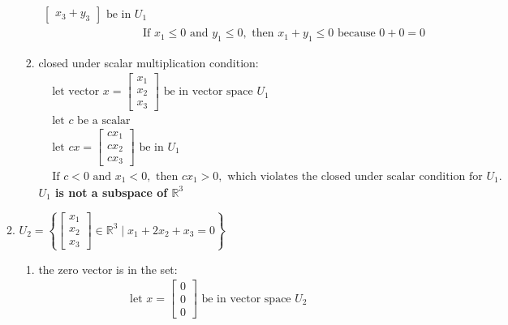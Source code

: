 \documentclass[11pt]{article}
\begin{document}
\begin{enumerate}
\begin{enumerate}
\begin{enumerate}
\[\begin{aligned}
\begin{bmatrix}
                x_3 + y_3
            \end{bmatrix} \text{ be in } U_1 \\
            &\text{If } x_1 \leq 0 \text{ and } y_1 \leq 0, \text{ then } x_1 + y_1 \leq 0 \text{ because } 0 + 0 = 0
        \end{aligned}
        \]
        \item closed under scalar multiplication condition:
        \[
        \begin{aligned}
            &\text{let vector } x = \begin{bmatrix}
                x_1 \\
                x_2 \\
                x_3
            \end{bmatrix} \text{ be in vector space } U_1 \\
            &\text{let } c \text{ be a scalar} \\
            &\text{let } cx = \begin{bmatrix}
                cx_1 \\
                cx_2 \\
                cx_3
            \end{bmatrix} \text{ be in } U_1 \\
           & \text{If } c < 0 \text{ and } x_1 < 0, \text{ then } c x_1 > 0, \text{ which violates the closed under scalar condition for } U_1.
        \end{aligned}
        \]
        \textbf{ \( U_1 \) is not a subspace of \( \mathbb{R}^3 \)}
    \end{enumerate}
    \item \( U_2 = \left\{ \begin{bmatrix}
        x_1 \\
        x_2 \\
        x_3
        \end{bmatrix} \in \mathbb{R}^3 \mid x_1 + 2x_2 + x_3 = 0 \right\} \)
    \begin{enumerate}
        \item the zero vector is in the set:
        \[
        \begin{aligned}
            &\text{let } x = \begin{bmatrix}
                0 \\
                0 \\
                0
            \end{bmatrix} \text{ be in vector space } U_2 \\

\end{aligned}\]
\end{enumerate}
\end{enumerate}
\end{enumerate}
\end{document}
